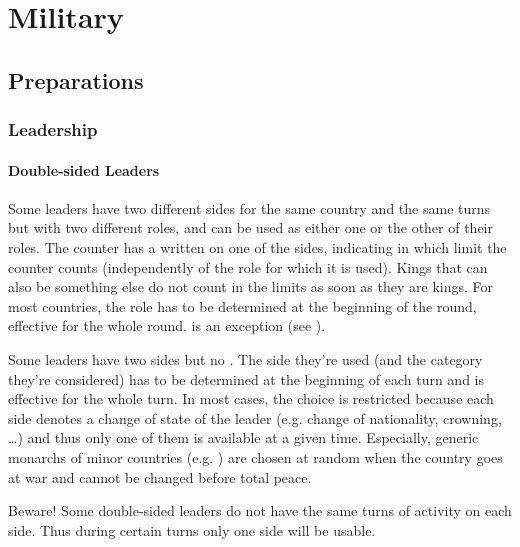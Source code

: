 \chapter{Military}\label{chapter:military}

\section{Preparations}

\subsection{Leadership}\label{chMilitary:Leadership}
\subsubsection{Double-sided Leaders}\label{chMilitary:Double Sided Leaders}
\aparag Some leaders have two different sides for the same country and the
same turns but with two different roles, and can be used as either one or the
other of their roles.
\bparag The counter has a {\textetoile} written on one of the sides,
indicating in which limit the counter counts (independently of the role
for which it is used).
\bparag Kings that can also be something else do not count in the limits
as soon as they are kings.
\bparag For most countries, the role has to be determined at the
beginning of the round, effective for the whole round. \POR is an
exception (see ).

\aparag Some leaders have two sides but no {\textetoile}.
\bparag The side they're used (and the category they're considered) has
to be determined at the beginning of each turn and is effective for the
whole turn.
\bparag In most cases, the choice is restricted because each side
denotes a change of state of the leader (e.g. change of nationality,
crowning, \ldots) and thus only one of them is available at a given
time.
\bparag Especially, generic monarchs of minor countries
(e.g. \leaderShah) are chosen at random when the country goes at war and
cannot be changed before total peace.

\aparag Beware! Some double-sided leaders do not have the same turns of
activity on each side. Thus during certain turns only one side will be
usable.

